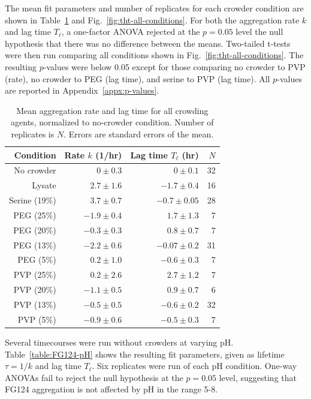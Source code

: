 The mean fit parameters and number of replicates for each crowder condition are shown in Table~\ref{table:crowder-params} and Fig.~\ref{fig:tht-all-conditions}.  For both the aggregation rate $k$ and lag time $T_\ell$, a one-factor ANOVA rejected at the $p=0.05$ level the null hypothesis that there was no difference between the means.  Two-tailed t-tests were then run comparing all conditions shown in Fig.~\ref{fig:tht-all-conditions}.  The resulting $p$-values were below 0.05 except for those comparing no crowder to PVP (rate), no crowder to PEG (lag time), and serine to PVP (lag time).  All $p$-values are reported in Appendix~\ref{appx:p-values}.



\begin{table}[b!]
\centering
  \caption[Aggregation rates and lag times for all crowding agents.]{Mean aggregation rate and lag time for all crowding agents, normalized to no-crowder condition. Number of replicates is $N$. Errors are standard errors of the mean.}
    \label{table:crowder-params}
    \begin{tabular}{r |r |r| r}%
       Condition & Rate $k$ (1/hr) & Lag time $T_\ell$ (hr)  & $N$ \\
      \hline
	No crowder & $0\pm0.3$ & $0\pm0.1$& 32\\
	Lysate & $2.7\pm1.6$  & $-1.7\pm0.4 $ & 16 \\
     	Serine (19\%)& $3.7\pm0.7$  & $-0.7\pm0.05  $& 28 \\
      	PEG (25\%) & $-1.9\pm0.4$  & $1.7\pm1.3  $ & 7 \\
     	PEG (20\%) & $-0.3\pm0.3$   & $0.8\pm0.7$  & 7 \\
	PEG (13\%) & $-2.2\pm 0.6$ & $-0.07\pm 0.2 $ & 31 \\
	PEG (5\%) & $0.2\pm1.0$  & $-0.6\pm0.3 $ & 7 \\
      	PVP (25\%) & $0.2\pm2.6$  & $2.7\pm1.2 $  & 7 \\
     	PVP (20\%) & $-1.1\pm0.5$  & $0.9\pm0.7$   & 6\\
	PVP (13\%) & $-0.5\pm0.5$  & $-0.6\pm0.2 $ & 32\\
	PVP (5\%) & $-0.9\pm0.6$  & $-0.5\pm0.3$   & 7 \\
    \end{tabular}
\end{table}

Several timecourses were run without crowders at varying pH.  Table~\ref{table:FG124-pH} shows the resulting fit parameters, given as lifetime $\tau = 1/k$ and lag time $T_\ell$.  Six replicates were run of each pH condition.  One-way ANOVAs fail to reject the null hypothesis at the $p=0.05$ level, suggesting that FG124 aggregation is not affected by pH in the range 5-8.

